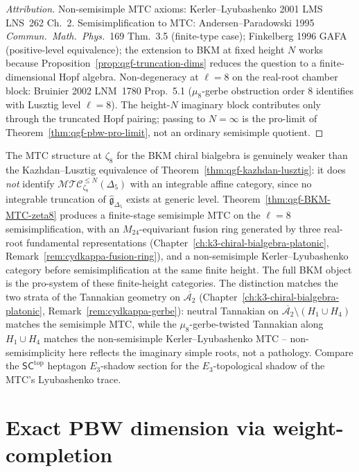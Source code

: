 \begin{proof}[Attribution]
Non-semisimple MTC axioms: Kerler--Lyubashenko 2001 LMS LNS~262 Ch.~2.
Semisimplification to MTC: Andersen--Paradowski 1995
\emph{Commun.~Math.~Phys.}~169 Thm.~3.5 (finite-type case);
Finkelberg 1996 GAFA (positive-level equivalence); the extension to
BKM at fixed height \(N\) works because
Proposition~\ref{prop:qgf-truncation-dims} reduces the
question to a finite-dimensional Hopf algebra. Non-degeneracy at
\(\ell = 8\) on the real-root chamber block:
Bruinier 2002 LNM~1780 Prop.~5.1 ($\mu_8$-gerbe obstruction
order \(8\) identifies with Lusztig level \(\ell = 8\)). The
height-\(N\) imaginary block contributes only through the truncated
Hopf pairing; passing to \(N=\infty\) is the pro-limit of
Theorem~\ref{thm:qgf-pbw-pro-limit}, not an ordinary semisimple
quotient.
\end{proof}

\begin{remark}
\label{rem:qgf-BKM-small-scope}
The MTC structure at $\zeta_8$ for the BKM chiral bialgebra is genuinely
weaker than the Kazhdan--Lusztig equivalence of
Theorem~\ref{thm:qgf-kazhdan-lusztig}: it does \emph{not} identify
\(\mathcal{MTC}_{\zeta_8}^{\leq N}(\Delta_5)\) with an integrable affine category,
since no integrable truncation of $\widehat{\mathfrak g}_{\Delta_5}$
exists at generic level. Theorem~\ref{thm:qgf-BKM-MTC-zeta8} produces
a finite-stage semisimple MTC on the \(\ell = 8\) semisimplification, with an
$M_{24}$-equivariant fusion ring generated by three real-root
fundamental representations
(Chapter~\ref{ch:k3-chiral-bialgebra-platonic},
Remark~\ref{rem:cydkappa-fusion-ring}), and a non-semisimple
Kerler--Lyubashenko category before semisimplification at the same
finite height. The full BKM object is the pro-system of these
finite-height categories.
The distinction matches the two strata of the Tannakian geometry on
$\overline{\mathcal A_2}$
(Chapter~\ref{ch:k3-chiral-bialgebra-platonic},
Remark~\ref{rem:cydkappa-gerbe}): neutral Tannakian on
$\overline{\mathcal A_2}\setminus (H_1\cup H_4)$ matches the
semisimple MTC, while the $\mu_8$-gerbe-twisted Tannakian along
$H_1\cup H_4$ matches the non-semisimple Kerler--Lyubashenko MTC --
non-semisimplicity here reflects the imaginary simple roots, not a
pathology. Compare the $\mathsf{SC}^{\mathrm{top}}$ heptagon
$E_3$-shadow section for the $E_3$-topological shadow
of the MTC's Lyubashenko trace.
\end{remark}

\section{Exact PBW dimension via weight-completion}
\label{sec:qgf-pbw-weight-completion}

